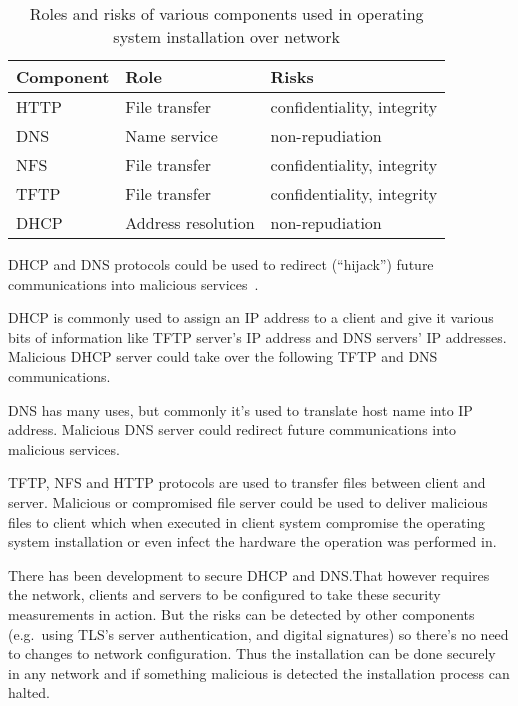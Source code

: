 \begin{table}[!ht]
  \def\arraystretch{1.1}%
  \begin{center}
    \begin{tabular}{| l | l | l |}
      \hline
      Component   & Role               & Risks                      \\
      \hline
      HTTP        & File transfer      & confidentiality, integrity \\
      DNS         & Name service       & non-repudiation            \\
      NFS         & File transfer      & confidentiality, integrity \\
      TFTP        & File transfer      & confidentiality, integrity \\
      DHCP        & Address resolution & non-repudiation            \\
      \hline
    \end{tabular}
    \caption{Roles and risks of various components used in operating
      system installation over network\label{tab:risks_table}}
  \end{center}
\end{table}

DHCP and DNS protocols could be used to redirect (``hijack'') future
communications into malicious
services~\cite{green2005dns}\cite{ornaghi2003man}.

DHCP is commonly used to assign an IP address to a client and give it
various bits of information like TFTP server's IP address and DNS
servers' IP addresses. Malicious DHCP server could take over the
following TFTP and DNS communications.

DNS has many uses, but commonly it's used to translate host name into
IP address. Malicious DNS server could redirect future communications
into malicious services.

TFTP, NFS and HTTP protocols are used to transfer files between client
and server. Malicious or compromised file server could be used to
deliver malicious files to client which when executed in client system
compromise the operating system installation or even infect the
hardware the operation was performed in.

There has been development to secure DHCP and DNS.\@ That however
requires the network, clients and servers to be configured to take
these security measurements in action. But the risks can be detected
by other components (e.g.\ using TLS's server authentication, and
digital signatures) so there's no need to changes to network
configuration. Thus the installation can be done securely in any
network and if something malicious is detected the installation
process can halted.

